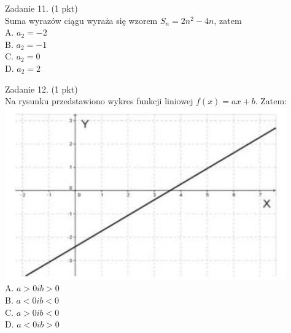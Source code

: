 \documentclass[10pt]{article}
\begin{document}
Zadanie 11. (1 pkt)\\
Suma wyrazów ciągu wyraża się wzorem \(S_{n}=2 n^{2}-4 n\), zatem\\
A. \(a_{2}=-2\)\\
B. \(a_{2}=-1\)\\
C. \(a_{2}=0\)\\
D. \(a_{2}=2\)

Zadanie 12. (1 pkt)\\
Na rysunku przedstawiono wykres funkcji liniowej \(f(x)=a x+b\). Zatem:\\
\includegraphics[max width=\textwidth, center]{2024_11_21_8e981e1ab2c7e641f462g-04}\\
A. \(a>0 i b>0\)\\
B. \(a<0 i b<0\)\\
C. \(a>0 i b<0\)\\
D. \(a<0 i b>0\)
\end{document}
